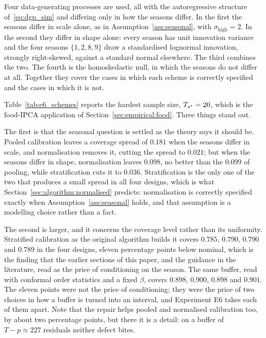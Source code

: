 Four data-generating processes are used, all with the autoregressive
structure of~\eqref{eq:dgp_sim} and differing only in how the seasons
differ.  In the first the seasons differ in scale alone, as in
Assumption~\ref{ass:seasonal}, with $\sigma_{\mathrm{high}} = 2$.  In the
second they differ in shape alone: every season has unit innovation
variance and the four seasons $\{1,2,8,9\}$ draw a standardised
lognormal innovation, strongly right-skewed, against a standard normal
elsewhere.  The third combines the two.  The fourth is the homoskedastic
null, in which the seasons do not differ at all.  Together they cover the
cases in which each scheme is correctly specified and the cases in which
it is not.



Table~\ref{tab:e6_schemes} reports the hardest sample size,
$T_{s^*} = 20$, which is the food-IPCA application of
Section~\ref{sec:empirical:food}.  Three things stand out.

The first is that the seasonal question is settled as the theory says it
should be.  Pooled calibration leaves a coverage spread of $0.181$ when
the seasons differ in scale, and normalisation removes it, cutting the
spread to $0.021$; but when the seasons differ in shape, normalisation
leaves $0.098$, no better than the $0.099$ of pooling, while
stratification cuts it to $0.036$.  Stratification is the only one of the
two that produces a small spread in all four designs, which is what
Section~\ref{sec:algorithm:normalised} predicts: normalisation is
correctly specified exactly when Assumption~\ref{ass:seasonal} holds, and
that assumption is a modelling choice rather than a fact.

The second is larger, and it concerns the coverage level rather than its
uniformity.  Stratified calibration as the original algorithm builds it
covers $0.785$, $0.790$, $0.790$ and $0.789$ in the four designs, eleven
percentage points below nominal, which is the finding that the earlier
sections of this paper, and the guidance in the literature, read as the
price of conditioning on the season.  The same buffer, read with
conformal order statistics and a fixed $\beta$, covers $0.898$, $0.900$,
$0.898$ and $0.901$.  The eleven points were not the price of
conditioning; they were the price of two choices in how a buffer is
turned into an interval, and Experiment E6 takes each of them apart.
Note that the repair helps pooled and normalised calibration too, by
about two percentage points, but there it is a detail: on a buffer of
$T - p \approx 227$ residuals neither defect bites.

